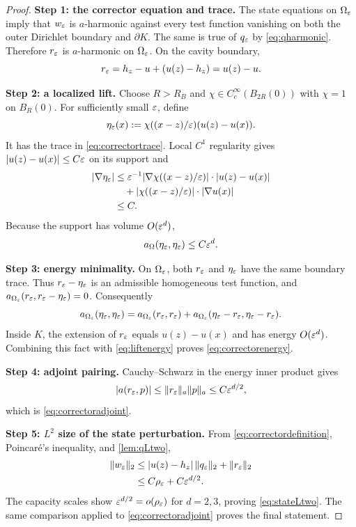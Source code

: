\begin{proof}
\textbf{Step 1: the corrector equation and trace.}
The state equations on $\Omega_\varepsilon$ imply that $w_\varepsilon$ is $a$-harmonic
against every test function vanishing on both the outer Dirichlet boundary and
$\partial K$.  The same is true of $q_\varepsilon$ by
\cref{eq:qharmonic}.  Therefore $r_\varepsilon$ is $a$-harmonic on
$\Omega_\varepsilon$.  On the cavity boundary,
\begin{equation}
 r_\varepsilon=h_z-u+(u(z)-h_z)=u(z)-u.
 \label{eq:correctortrace}
\end{equation}

\textbf{Step 2: a localized lift.}
Choose $R>R_B$ and $\chi\in C_c^\infty(B_{2R}(0))$ with
$\chi=1$ on $B_R(0)$.  For sufficiently small $\varepsilon$, define
\begin{equation}
 \eta_\varepsilon(x):=\chi((x-z)/\varepsilon)(u(z)-u(x)).
\end{equation}
It has the trace in \cref{eq:correctortrace}.  Local $C^1$ regularity gives
$|u(z)-u(x)|\le C\varepsilon$ on its support and
\begin{align}
 |\nabla\eta_\varepsilon|
 &\le\varepsilon^{-1}|\nabla\chi((x-z)/\varepsilon)|
              \cdot|u(z)-u(x)|\notag\\
 &\quad+|\chi((x-z)/\varepsilon)|\cdot|\nabla u(x)|\notag\\
 &\le C.
\end{align}
Because the support has volume $O(\varepsilon^d)$,
\begin{equation}
 a_\Omega(\eta_\varepsilon,\eta_\varepsilon)\le C\varepsilon^d.
 \label{eq:liftenergy}
\end{equation}

\textbf{Step 3: energy minimality.}
On $\Omega_\varepsilon$, both $r_\varepsilon$ and $\eta_\varepsilon$ have the same boundary trace.
Thus $r_\varepsilon-\eta_\varepsilon$ is an admissible homogeneous test function, and
$a_{\Omega_\varepsilon}(r_\varepsilon,r_\varepsilon-\eta_\varepsilon)=0$.  Consequently
\begin{equation}
 a_{\Omega_\varepsilon}(\eta_\varepsilon,\eta_\varepsilon)
 =a_{\Omega_\varepsilon}(r_\varepsilon,r_\varepsilon)
  +a_{\Omega_\varepsilon}(\eta_\varepsilon-r_\varepsilon,\eta_\varepsilon-r_\varepsilon).
\end{equation}
Inside $K$, the extension of $r_\varepsilon$ equals $u(z)-u(x)$ and has energy
$O(\varepsilon^d)$.  Combining this fact with \cref{eq:liftenergy} proves
\cref{eq:correctorenergy}.

\textbf{Step 4: adjoint pairing.}
Cauchy--Schwarz in the energy inner product gives
\begin{equation}
 |a(r_\varepsilon,p)|\le\|r_\varepsilon\|_a\|p\|_a
 \le C\varepsilon^{d/2},
\end{equation}
which is \cref{eq:correctoradjoint}.

\textbf{Step 5: $L^2$ size of the state perturbation.}
From \cref{eq:correctordefinition}, Poincar\'e's inequality, and
\cref{lem:qLtwo},
\begin{align}
 \|w_\varepsilon\|_2
 &\le |u(z)-h_z|\,\|q_\varepsilon\|_2+\|r_\varepsilon\|_2\\
 &\le C\rho_\varepsilon+C\varepsilon^{d/2}.
\end{align}
The capacity scales show $\varepsilon^{d/2}=o(\rho_\varepsilon)$ for $d=2,3$, proving
\cref{eq:stateLtwo}.  The same comparison applied to
\cref{eq:correctoradjoint} proves the final statement.
\end{proof}

